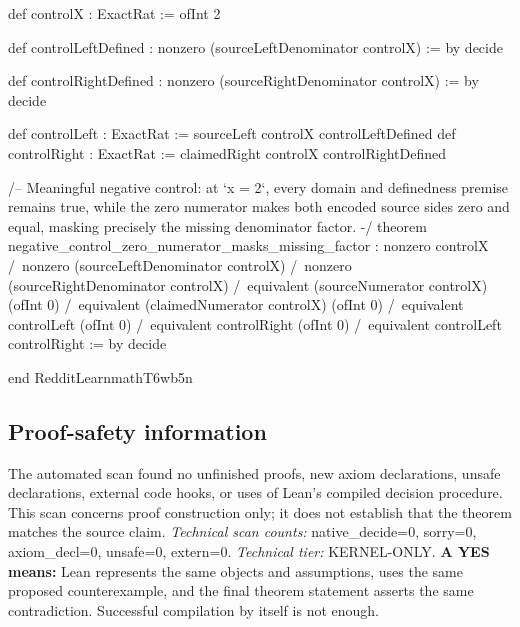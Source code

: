 \documentclass[11pt]{article}
\begin{document}
\begin{Vlean}
def controlX : ExactRat := ofInt 2

def controlLeftDefined : nonzero (sourceLeftDenominator controlX) := by
  decide

def controlRightDefined : nonzero (sourceRightDenominator controlX) := by
  decide

def controlLeft : ExactRat := sourceLeft controlX controlLeftDefined
def controlRight : ExactRat := claimedRight controlX controlRightDefined

/-- Meaningful negative control: at `x = 2`, every domain and definedness
premise remains true, while the zero numerator makes both encoded source sides
zero and equal, masking precisely the missing denominator factor. -/
theorem negative_control_zero_numerator_masks_missing_factor :
    nonzero controlX /\
    nonzero (sourceLeftDenominator controlX) /\
    nonzero (sourceRightDenominator controlX) /\
    equivalent (sourceNumerator controlX) (ofInt 0) /\
    equivalent (claimedNumerator controlX) (ofInt 0) /\
    equivalent controlLeft (ofInt 0) /\
    equivalent controlRight (ofInt 0) /\
    equivalent controlLeft controlRight := by
  decide

end RedditLearnmathT6wb5n

\end{Vlean}
\subsection*{Proof-safety information}
The automated scan found no unfinished proofs, new axiom declarations, unsafe declarations, external code hooks, or uses of Lean's compiled decision procedure. This scan concerns proof construction only; it does not establish that the theorem matches the source claim.
\textit{Technical scan counts:} native\_decide=0, sorry=0, axiom\_decl=0, unsafe=0, extern=0. \textit{Technical tier:} KERNEL-ONLY.
\textbf{A YES means:} Lean represents the same objects and assumptions, uses the same proposed counterexample, and the final theorem statement asserts the same contradiction. Successful compilation by itself is not enough.
\clearpage
\end{document}
